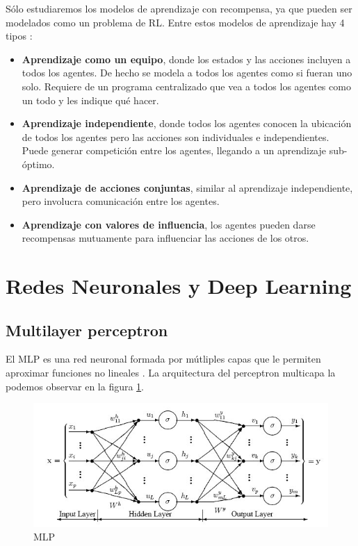 Sólo estudiaremos los modelos de aprendizaje con recompensa, ya que pueden ser modelados como un problema de \ac{RL}. Entre estos modelos de aprendizaje hay 4 tipos \cite{claus1998dynamics}:
\begin{itemize}
\item \textbf{Aprendizaje como un equipo}, donde los estados y las acciones incluyen a todos los agentes. De hecho se modela a todos los agentes como si fueran uno solo. Requiere de un programa centralizado que vea a todos los agentes como un todo y les indique qué hacer.
\item \textbf{Aprendizaje independiente}, donde todos los agentes conocen la ubicación de todos los agentes pero las acciones son individuales e independientes. Puede generar competición entre los agentes, llegando a un aprendizaje sub-óptimo.
\item \textbf{Aprendizaje de acciones conjuntas}, similar al aprendizaje independiente, pero involucra comunicación entre los agentes.
\item \textbf{Aprendizaje con valores de influencia}, los agentes pueden darse recompensas mutuamente para influenciar las acciones de los otros.
\end{itemize}


\section{Redes Neuronales y Deep Learning}

\subsection{Multilayer perceptron}

El \ac{MLP} es una red neuronal formada por mútliples capas que le permiten aproximar funciones no lineales \cite{yang2010multi}. La arquitectura del perceptron multicapa la podemos observar en la figura \ref{fig:mlp}.

\begin{figure}[htb]
\centering
\includegraphics[width=150mm]{./graficos/mlp.jpg}
\caption{MLP} \label{fig:mlp}
\end{figure}

